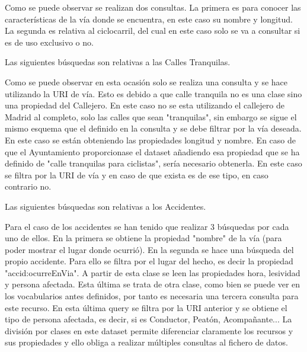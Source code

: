 Como se puede observar se realizan dos consultas. La primera es para conocer las características de la vía donde se encuentra, en este caso su nombre y longitud. La segunda es relativa al ciclocarril, del cual en este caso solo se va a consultar si es de uso exclusivo o no.
\newline

Las siguientes búsquedas son relativas a las Calles Tranquilas.


Como se puede observar en esta ocasión solo se realiza una consulta y se hace utilizando la URI de vía. Esto es debido a que calle tranquila no es una clase sino una propiedad del Callejero. En este caso no se esta utilizando el callejero de Madrid al completo, solo las calles que sean "tranquilas", sin embargo se sigue el mismo esquema que el definido en la consulta y se debe filtrar por la vía deseada.
En este caso se están obteniendo las propiedades longitud y nombre. En caso de que el Ayuntamiento proporcionase el dataset añadiendo esa propiedad que se ha definido de "calle tranquilas para ciclistas", sería necesario obtenerla. En este caso se filtra por la URI de vía y en caso de que exista es de ese tipo, en caso contrario no.


Las siguientes búsquedas son relativas a los Accidentes.


Para el caso de los accidentes se han tenido que realizar 3 búsquedas por cada uno de ellos. En la primera se obtiene la propiedad "nombre" de la vía (para poder mostrar el lugar donde ocurrió). En la segunda se hace una búsqueda del propio accidente. Para ello se filtra por el lugar del hecho, es decir la propiedad "accid:ocurreEnVia". A partir de esta clase se leen las propiedades hora, lesividad y persona afectada. Esta última se trata de otra clase, como bien se puede ver en los vocabularios antes definidos, por tanto es necesaria una tercera consulta para este recurso. En esta última query se filtra por la URI anterior y se obtiene el tipo de persona afectada, es decir, si es Conductor, Peatón, Acompañante... La división por clases en este dataset permite diferenciar claramente los recursos y sus propiedades y ello obliga a realizar múltiples consultas al fichero de datos.

